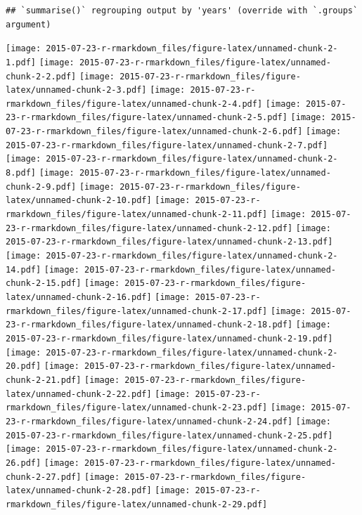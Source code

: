 \documentclass[
]{article}
\begin{document}
\begin{verbatim}
## `summarise()` regrouping output by 'years' (override with `.groups` argument)
\end{verbatim}

\texttt{[image: 2015-07-23-r-rmarkdown\_files/figure-latex/unnamed-chunk-2-1.pdf]}
\texttt{[image: 2015-07-23-r-rmarkdown\_files/figure-latex/unnamed-chunk-2-2.pdf]}
\texttt{[image: 2015-07-23-r-rmarkdown\_files/figure-latex/unnamed-chunk-2-3.pdf]}
\texttt{[image: 2015-07-23-r-rmarkdown\_files/figure-latex/unnamed-chunk-2-4.pdf]}
\texttt{[image: 2015-07-23-r-rmarkdown\_files/figure-latex/unnamed-chunk-2-5.pdf]}
\texttt{[image: 2015-07-23-r-rmarkdown\_files/figure-latex/unnamed-chunk-2-6.pdf]}
\texttt{[image: 2015-07-23-r-rmarkdown\_files/figure-latex/unnamed-chunk-2-7.pdf]}
\texttt{[image: 2015-07-23-r-rmarkdown\_files/figure-latex/unnamed-chunk-2-8.pdf]}
\texttt{[image: 2015-07-23-r-rmarkdown\_files/figure-latex/unnamed-chunk-2-9.pdf]}
\texttt{[image: 2015-07-23-r-rmarkdown\_files/figure-latex/unnamed-chunk-2-10.pdf]}
\texttt{[image: 2015-07-23-r-rmarkdown\_files/figure-latex/unnamed-chunk-2-11.pdf]}
\texttt{[image: 2015-07-23-r-rmarkdown\_files/figure-latex/unnamed-chunk-2-12.pdf]}
\texttt{[image: 2015-07-23-r-rmarkdown\_files/figure-latex/unnamed-chunk-2-13.pdf]}
\texttt{[image: 2015-07-23-r-rmarkdown\_files/figure-latex/unnamed-chunk-2-14.pdf]}
\texttt{[image: 2015-07-23-r-rmarkdown\_files/figure-latex/unnamed-chunk-2-15.pdf]}
\texttt{[image: 2015-07-23-r-rmarkdown\_files/figure-latex/unnamed-chunk-2-16.pdf]}
\texttt{[image: 2015-07-23-r-rmarkdown\_files/figure-latex/unnamed-chunk-2-17.pdf]}
\texttt{[image: 2015-07-23-r-rmarkdown\_files/figure-latex/unnamed-chunk-2-18.pdf]}
\texttt{[image: 2015-07-23-r-rmarkdown\_files/figure-latex/unnamed-chunk-2-19.pdf]}
\texttt{[image: 2015-07-23-r-rmarkdown\_files/figure-latex/unnamed-chunk-2-20.pdf]}
\texttt{[image: 2015-07-23-r-rmarkdown\_files/figure-latex/unnamed-chunk-2-21.pdf]}
\texttt{[image: 2015-07-23-r-rmarkdown\_files/figure-latex/unnamed-chunk-2-22.pdf]}
\texttt{[image: 2015-07-23-r-rmarkdown\_files/figure-latex/unnamed-chunk-2-23.pdf]}
\texttt{[image: 2015-07-23-r-rmarkdown\_files/figure-latex/unnamed-chunk-2-24.pdf]}
\texttt{[image: 2015-07-23-r-rmarkdown\_files/figure-latex/unnamed-chunk-2-25.pdf]}
\texttt{[image: 2015-07-23-r-rmarkdown\_files/figure-latex/unnamed-chunk-2-26.pdf]}
\texttt{[image: 2015-07-23-r-rmarkdown\_files/figure-latex/unnamed-chunk-2-27.pdf]}
\texttt{[image: 2015-07-23-r-rmarkdown\_files/figure-latex/unnamed-chunk-2-28.pdf]}
\texttt{[image: 2015-07-23-r-rmarkdown\_files/figure-latex/unnamed-chunk-2-29.pdf]}
\end{document}

